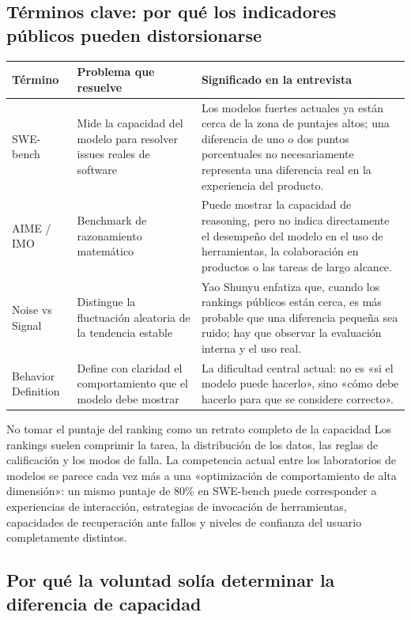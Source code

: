 \documentclass[a4paper]{article}
\begin{document}
\subsection{Términos clave: por qué los indicadores públicos pueden distorsionarse}

\noindent\begin{tabularx}{\textwidth}{p{}p{}X}
\toprule
Término & Problema que resuelve & Significado en la entrevista \\
\midrule
SWE-bench & Mide la capacidad del modelo para resolver issues reales de software & Los modelos fuertes actuales ya están cerca de la zona de puntajes altos; una diferencia de uno o dos puntos porcentuales no necesariamente representa una diferencia real en la experiencia del producto. \\
AIME / IMO & Benchmark de razonamiento matemático & Puede mostrar la capacidad de reasoning, pero no indica directamente el desempeño del modelo en el uso de herramientas, la colaboración en productos o las tareas de largo alcance. \\
Noise vs Signal & Distingue la fluctuación aleatoria de la tendencia estable & Yao Shunyu enfatiza que, cuando los rankings públicos están cerca, es más probable que una diferencia pequeña sea ruido; hay que observar la evaluación interna y el uso real. \\
Behavior Definition & Define con claridad el comportamiento que el modelo debe mostrar & La dificultad central actual: no es «si el modelo puede hacerlo», sino «cómo debe hacerlo para que se considere correcto». \\
\bottomrule
\end{tabularx}

\begin{warningbox}{No tomar el puntaje del ranking como un retrato completo de la capacidad}
Los rankings suelen comprimir la tarea, la distribución de los datos, las reglas de calificación y los modos de falla. La competencia actual entre los laboratorios de modelos se parece cada vez más a una «optimización de comportamiento de alta dimensión»: un mismo puntaje de 80\% en SWE-bench puede corresponder a experiencias de interacción, estrategias de invocación de herramientas, capacidades de recuperación ante fallos y niveles de confianza del usuario completamente distintos.
\end{warningbox}

\subsection{Por qué la voluntad solía determinar la diferencia de capacidad}
\end{document}
